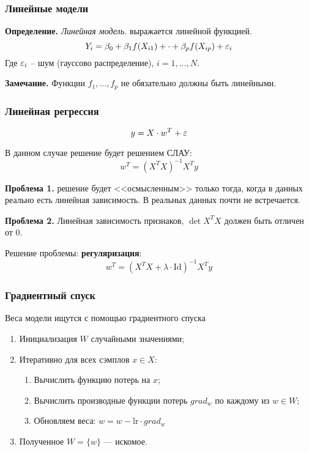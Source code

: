 \documentclass[a4paper,14pt]{article}
\begin{document}
    \subsubsection{Линейные модели}

    {\bf Определение.} { \it Линейная модель.} выражается линейной функцией.
    \[
        Y_i = \beta_0 + \beta_1 f(X_{i1}) + \cdot + \beta_p f(X_{ip}) + \varepsilon_i
    \]
    Где $\varepsilon_i$ -- шум (гауссово распределение), $i = 1,\dots, N$.

    {\bf Замечание.} Функции $f_1, \dots, f_p$ не обязательно должны быть линейными.

    \subsubsection{Линейная регрессия}

    \[
        y = X \cdot w^{T} + \varepsilon
    \]

    В данном случае решение будет решением СЛАУ:
    \[
        w^T = \left(X^{T}X\right)^{-1}X^T y
    \]

    {\bf Проблема 1.} решение будет <<осмысленным>> только тогда, когда в данных реально есть линейная зависимость. В реальных данных почти не встречается.

    {\bf Проблема 2.} Линейная зависимость признаков, $\det X^{T}X$ должен быть отличен от $0$.

    Решение проблемы: {\bf регуляризация}:
    \[
        w^T = \left(X^{T}X + \lambda \cdot \mathrm{Id} \right)^{-1}X^T y
    \]

    \subsubsection{Градиентный спуск}

    Веса модели ищутся с помощью градиентного спуска
    \begin{enumerate}
        \item Инициализация $W$ случайными значениями;
        \item Итеративно для всех сэмплов $x \in X$:
        \begin{enumerate}
            \item Вычислить функцию потерь на $x$;
            \item Вычислить производные функции потерь $grad_w$ по каждому из $w \in W$;
            \item Обновляем веса: $w = w - \mathrm{lr} \cdot grad_w$
        \end{enumerate}
        \item Полученное $W = \{w\}$ --- искомое.
    \end{enumerate}
\end{document}
